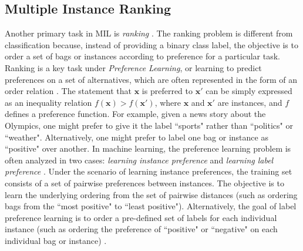 \subsection{Multiple Instance Ranking}\label{sec:MI_Ranking}

Another primary task in MIL is \textit{ranking} \citep{Carbonneau2016MILSurvey}.  The ranking problem is different from classification because, instead of providing a binary class label, the objective is to order a set of bags \citep{Bergeron2008MIRanking,Bergeron2012FastBundleMILRanking} or instances \citep{Hu2008MIRanking} according to preference for a particular task.  Ranking is a key task under \textit{Preference Learning}, or learning to predict preferences on a set of alternatives, which are often represented in the form of an order relation \citep{Furnkranz2003RankingSummary}.  The statement that $\bm{x}$ is preferred to $\bm{x}'$ can be simply expressed as an inequality relation $f(\bm{x}) > f(\bm{x}')$, where $\bm{x}$ and $\bm{x}'$ are instances, and $f$ defines a preference function.  For example, given a news story about the Olympics, one might prefer to give it the label ``sports" rather than ``politics" or ``weather".  Alternatively, one might prefer to label one bag or instance as ``positive" over another.  In machine learning, the preference learning problem is often analyzed in two cases: \textit{learning instance preference} and \textit{learning label preference} \citep{Chu2005LearningPreferencesWithGaussianProcesses}.  Under the scenario of learning instance preferences, the training set consists of a set of pairwise preferences between instances.  The objective is to learn the underlying ordering from the set of pairwise distances (such as ordering bags from the ``most positive" to ``least positive").  Alternatively, the goal of label preference learning is to order a pre-defined set of labels for each individual instance (such as ordering the preference of ``positive" or ``negative" on each individual bag or instance) \citep{Dekel2004Ranking,Aiolli2004LearningPreferences}.   

